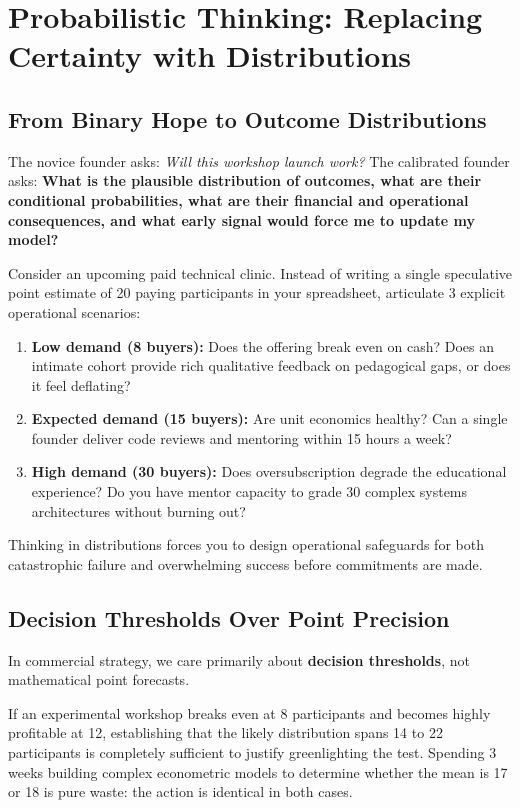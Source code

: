 \section{Probabilistic Thinking: Replacing Certainty with Distributions}

\subsection{From Binary Hope to Outcome Distributions}

The novice founder asks: \textit{Will this workshop launch work?} The calibrated founder asks: \textbf{What is the plausible distribution of outcomes, what are their conditional probabilities, what are their financial and operational consequences, and what early signal would force me to update my model?}

Consider an upcoming paid technical clinic. Instead of writing a single speculative point estimate of 20 paying participants in your spreadsheet, articulate 3 explicit operational scenarios:

\begin{enumerate}[leftmargin=12pt,itemsep=2pt,topsep=1pt,parsep=0pt]
  \item \textbf{Low demand (8 buyers):} Does the offering break even on cash? Does an intimate cohort provide rich qualitative feedback on pedagogical gaps, or does it feel deflating?
  \item \textbf{Expected demand (15 buyers):} Are unit economics healthy? Can a single founder deliver code reviews and mentoring within 15 hours a week?
  \item \textbf{High demand (30 buyers):} Does oversubscription degrade the educational experience? Do you have mentor capacity to grade 30 complex systems architectures without burning out?
\end{enumerate}

Thinking in distributions forces you to design operational safeguards for both catastrophic failure and overwhelming success before commitments are made.

\subsection{Decision Thresholds Over Point Precision}

In commercial strategy, we care primarily about \textbf{decision thresholds}, not mathematical point forecasts.

If an experimental workshop breaks even at 8 participants and becomes highly profitable at 12, establishing that the likely distribution spans 14 to 22 participants is completely sufficient to justify greenlighting the test. Spending 3 weeks building complex econometric models to determine whether the mean is 17 or 18 is pure waste: the action is identical in both cases.

